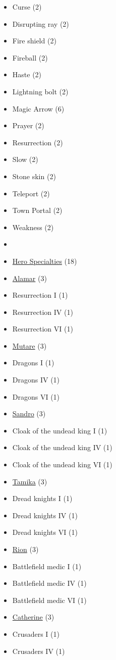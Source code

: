 \begin{multicols}{3}
\begin{itemize}[leftmargin=0pt, label={}, noitemsep, noitemsep]
  \item Curse (2)
  \item Disrupting ray (2)
  \item Fire shield (2)
  \item Fireball (2)
  \item Haste (2)
  \item Lightning bolt (2)
  \item Magic Arrow (6)
  \item Prayer (2)
  \item Resurrection (2)
  \item Slow (2)
  \item Stone skin (2)
  \item Teleport (2)
  \item Town Portal (2)
  \item Weakness (2)
  \item
  \item \underline{Hero Specialties} (18)
  \item \underline{Alamar} (3)
  \item Resurrection I (1)
  \item Resurrection IV (1)
  \item Resurrection VI (1)
  \item \underline{Mutare} (3)
  \item Dragons I (1)
  \item Dragons IV (1)
  \item Dragons VI (1)
  \item \underline{Sandro} (3)
  \item Cloak of the undead king I (1)
  \item Cloak of the undead king IV (1)
  \item Cloak of the undead king VI (1)
  \item \underline{Tamika} (3)
  \item Dread knights I (1)
  \item Dread knights IV (1)
  \item Dread knights VI (1)
  \item \underline{Rion} (3)
  \item Battlefield medic I (1)
  \item Battlefield medic IV (1)
  \item Battlefield medic VI (1)
  \item \underline{Catherine} (3)
  \item Crusaders I (1)
  \item Crusaders IV (1)

\end{itemize}
\end{multicols}
